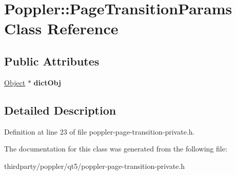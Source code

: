 \hypertarget{class_poppler_1_1_page_transition_params}{}\section{Poppler\+:\+:Page\+Transition\+Params Class Reference}
\label{class_poppler_1_1_page_transition_params}
\subsection*{Public Attributes}
\begin{DoxyCompactItemize}
\item 
\mbox{\label{class_poppler_1_1_page_transition_params_aa5a18f9d082ab53e6de1ba34479df028}} 
\hyperlink{class_object}{Object} $\ast$ {\bfseries dict\+Obj}
\end{DoxyCompactItemize}


\subsection{Detailed Description}


Definition at line 23 of file poppler-\/page-\/transition-\/private.\+h.



The documentation for this class was generated from the following file\+:\begin{DoxyCompactItemize}
\item 
thirdparty/poppler/qt5/poppler-\/page-\/transition-\/private.\+h\end{DoxyCompactItemize}
